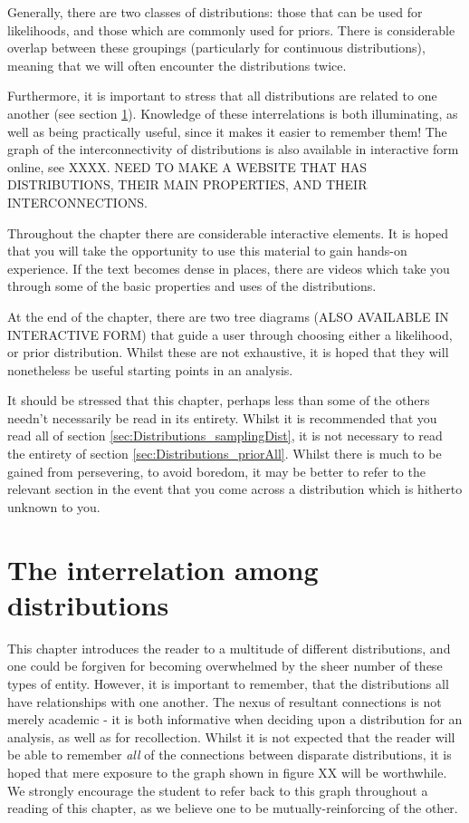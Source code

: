\documentclass[11pt,fullpage]{book}
\begin{document}
Generally, there are two classes of distributions: those that can be used for likelihoods, and those which are commonly used for priors. There is considerable overlap between these groupings (particularly for continuous distributions), meaning that we will often encounter the distributions twice. 

Furthermore, it is important to stress that all distributions are related to one another (see section \ref{sec:Distributions_relationships}). Knowledge of these interrelations is both illuminating, as well as being practically useful, since it makes it easier to remember them! The graph of the interconnectivity of distributions is also available in interactive form online, see XXXX. NEED TO MAKE A WEBSITE THAT HAS DISTRIBUTIONS, THEIR MAIN PROPERTIES, AND THEIR INTERCONNECTIONS.

Throughout the chapter there are considerable interactive elements. It is hoped that you will take the opportunity to use this material to gain hands-on experience. If the text becomes dense in places, there are videos which take you through some of the basic properties and uses of the distributions. 

At the end of the chapter, there are two tree diagrams (ALSO AVAILABLE IN INTERACTIVE FORM) that guide a user through choosing either a likelihood, or prior distribution. Whilst these are not exhaustive, it is hoped that they will nonetheless be useful starting points in an analysis.

It should be stressed that this chapter, perhaps less than some of the others needn't necessarily be read in its entirety. Whilst it is recommended that you read all of section \ref{sec:Distributions_samplingDist}, it is not necessary to read the entirety of section \ref{sec:Distributions_priorAll}. Whilst there is much to be gained from persevering, to avoid boredom, it may be better to refer to the relevant section in the event that you come across a distribution which is hitherto unknown to you.

\section{The interrelation among distributions}\label{sec:Distributions_relationships}
This chapter introduces the reader to a multitude of different distributions, and one could be forgiven for becoming overwhelmed by the sheer number of these types of entity. However, it is important to remember, that the distributions all have relationships with one another. The nexus of resultant connections is not merely academic - it is both informative when deciding upon a distribution for an analysis, as well as for recollection. Whilst it is not expected that the reader will be able to remember \textit{all} of the connections between disparate distributions, it is hoped that mere exposure to the graph shown in figure XX will be worthwhile. We strongly encourage the student to refer back to this graph throughout a reading of this chapter, as we believe one to be mutually-reinforcing of the other.
\end{document}
